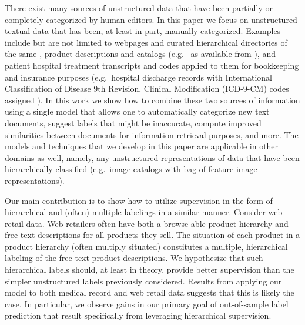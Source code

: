 There exist many sources of unstructured data that have been partially or completely categorized by human editors.  In this paper we focus on unstructured textual data that has been, at least in part, manually categorized.  Examples include but are not limited to webpages and curated hierarchical directories of the same \citep{DMOZ}, product descriptions and catalogs (e.g.~\citep{AMAZON} as available from \citep{SNAP}), and patient hospital treatment transcripts and  codes applied to them for bookkeeping and insurance purposes (e.g.~hospital discharge records with International Classification of Disease 9th Revision,
Clinical Modification (ICD-9-CM) codes assigned \cite{ICD9}).  In this work we show how to combine these two sources of information using a single model that allows one to automatically categorize new text documents, suggest labels that might be inaccurate, compute improved similarities between documents for information retrieval purposes, and more.  The models and techniques that we develop in this paper are applicable in other domains as well, namely, any unstructured representations of data that have been hierarchically classified (e.g.~image catalogs with bag-of-feature image representations). 


Our main contribution is to show how to utilize supervision in the form of  hierarchical and (often) multiple labelings in a similar manner.   Consider web retail data.  Web retailers often have both a browse-able product hierarchy and free-text descriptions for all products they sell.   The situation of each product in a product hierarchy (often multiply situated) constitutes a multiple, hierarchical labeling of the free-text product descriptions.  We hypothesize that such hierarchical labels should, at least in theory, provide better supervision than the simpler unstructured labels previously considered.  Results from applying our model to both medical record and web retail data suggests that this is likely the case.  In particular, we observe gains in our primary goal of out-of-sample label prediction that result specifically from leveraging hierarchical supervision. 

